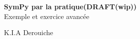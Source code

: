 \documentclass[11pt,fleqn]{book} %
\begin{document}

\begingroup
\thispagestyle{empty}
\centering
\vspace*{5cm}
\par\normalfont\fontsize{35}{35}\sffamily\selectfont
\textbf{SymPy par la pratique(DRAFT(wip))}\\
{\LARGE Exemple et exercice avancée}\par %
\vspace*{1cm}
{\Huge K.I.A Derouiche}\par %
\endgroup


\newpage
~\vfill
\thispagestyle{empty}



\pagestyle{empty} %

\tableofcontents %


\pagestyle{fancy} %







\end{document}
